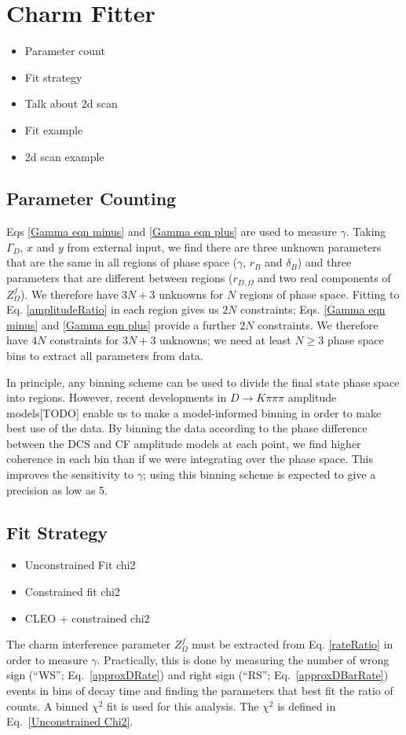 \documentclass[note.tex]{subfiles}
\begin{document}
\section{Charm Fitter}
\begin{itemize}
    \item Parameter count
    \item Fit strategy
    \item Talk about 2d scan
    \item Fit example
    \item 2d scan example
\end{itemize}
\subsection{Parameter Counting}
Eqs \ref{Gamma eqn minus} and \ref{Gamma eqn plus} are used to measure $\gamma$.
Taking $\Gamma_D$, $x$ and $y$ from external input, we find there are three unknown parameters that are the same in all regions of phase space ($\gamma$, $r_B$ and $\delta_B$) and three parameters that are different between regions ($r_{D, \Omega}$ and two real components of $Z_\Omega^f$).
We therefore have $3N + 3$ unknowns for $N$ regions of phase space.
Fitting to Eq. \ref{amplitudeRatio} in each region gives us $2N$ constraints; Eqs. \ref{Gamma eqn minus} and \ref{Gamma eqn plus} provide a further $2N$ constraints.
We therefore have $4N$ constraints for $3N + 3$ unknowns; we need at least $N\geq 3$ phase space bins to extract all parameters from data.

In principle, any binning scheme can be used to divide the final state phase space into regions.
However, recent developments in $D\rightarrow K \pi \pi \pi$ amplitude models[TODO] enable us to make a model-informed binning in order to make best use of the data.
By binning the data according to the phase difference between the DCS and CF amplitude models at each point,
we find higher coherence in each bin than if we were integrating over the phase space.
This improves the sensitivity to $\gamma$; using this binning scheme is expected to give a precision as low as 5\degree[TODO].

\subsection{Fit Strategy}
\begin{itemize}
    \item Unconstrained Fit chi2
    \item Constrained fit chi2
    \item CLEO + constrained chi2
\end{itemize}
The charm interference parameter $Z_\Omega^f$ must be extracted from Eq. \ref{rateRatio} in order to measure $\gamma$.
Practically, this is done by measuring the number of wrong sign (``WS''; Eq.~\ref{approxDRate}) and right sign (``RS''; Eq.~\ref{approxDBarRate})
events in bins of decay time and finding the parameters that best fit the ratio of counts.
A binned $\chi^2$ fit is used for this analysis. The $\chi^2$ is defined in Eq.~\ref{Unconstrained Chi2}.
\end{document}
